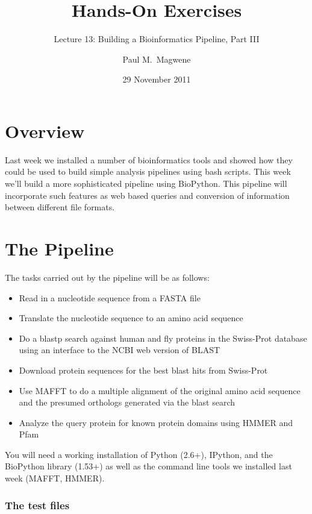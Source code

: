 \documentclass[10pt,letterpaper]{scrartcl}
\author{Paul M.~Magwene}
\title{Hands-On Exercises}
\subtitle{Lecture 13: Building a Bioinformatics Pipeline, Part III}
\date{29 November 2011}
\begin{document}
\maketitle

\section*{Overview}

Last week we installed a number of bioinformatics tools and showed how they could be used to build simple analysis pipelines using bash scripts.  This week we'll build a more sophisticated pipeline using BioPython.  This pipeline will incorporate such features as web based queries and conversion of information between different file formats.

\section*{The Pipeline}


The tasks carried out by the pipeline will be as follows:

\begin{itemize}

\item Read in a nucleotide sequence from a FASTA file
\item Translate the nucleotide sequence to an amino acid sequence
\item Do a blastp search against human and fly proteins in the Swiss-Prot database using an interface to the NCBI web version of BLAST
\item Download protein sequences for the best blast hits from Swiss-Prot
\item Use MAFFT to do a multiple alignment of the original amino acid sequence and the presumed orthologs generated via the blast search
\item Analyze the query protein for known protein domains using HMMER and Pfam

\end{itemize} 


You will need a working installation of Python (2.6+), IPython, and the BioPython library (1.53+) as well as the command line tools we installed last week (MAFFT, HMMER). 

\subsubsection*{The test files}
\end{document}
